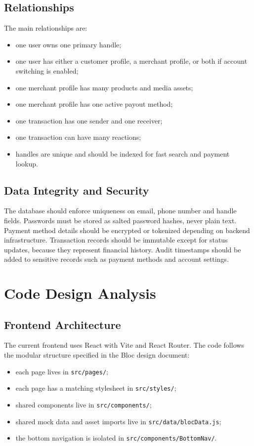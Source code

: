 \documentclass[12pt,a4paper]{article}
\begin{document}
\subsection{Relationships}
The main relationships are:
\begin{itemize}
    \item one user owns one primary handle;
    \item one user has either a customer profile, a merchant profile, or both if account switching is enabled;
    \item one merchant profile has many products and media assets;
    \item one merchant profile has one active payout method;
    \item one transaction has one sender and one receiver;
    \item one transaction can have many reactions;
    \item handles are unique and should be indexed for fast search and payment lookup.
\end{itemize}

\subsection{Data Integrity and Security}
The database should enforce uniqueness on email, phone number and handle fields. Passwords must be stored as salted password hashes, never plain text. Payment method details should be encrypted or tokenized depending on backend infrastructure. Transaction records should be immutable except for status updates, because they represent financial history. Audit timestamps should be added to sensitive records such as payment methods and account settings.

\section{Code Design Analysis}

\subsection{Frontend Architecture}
The current frontend uses React with Vite and React Router. The code follows the modular structure specified in the Bloc design document:
\begin{itemize}
    \item each page lives in \texttt{src/pages/};
    \item each page has a matching stylesheet in \texttt{src/styles/};
    \item shared components live in \texttt{src/components/};
    \item shared mock data and asset imports live in \texttt{src/data/blocData.js};
    \item the bottom navigation is isolated in \texttt{src/components/BottomNav/}.
\end{itemize}
\end{document}
